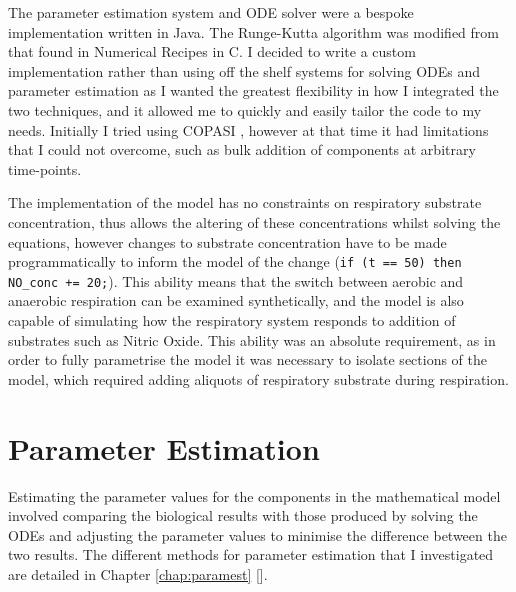 The parameter estimation system and ODE solver were a bespoke implementation written in Java. The Runge-Kutta algorithm was modified from that found in Numerical Recipes in C\cite{Press1992}. I decided to write a custom implementation rather than using off the shelf systems for solving ODEs and parameter estimation as I wanted the greatest flexibility in how I integrated the two techniques, and it allowed me to quickly and easily tailor the code to my needs. Initially I tried using COPASI \cite{Hoops2006}, however at that time it had limitations that I could not overcome, such as bulk addition of components at arbitrary time-points.

The implementation of the model has no constraints on respiratory substrate concentration, thus allows the altering of these concentrations whilst solving the equations, however changes to substrate concentration have to be made programmatically to inform the model of the change (\texttt{if (t == 50) then NO\_conc += 20;}). This ability means that the switch between aerobic and anaerobic respiration can be examined synthetically, and the model is also capable of simulating how the respiratory system responds to addition of substrates such as Nitric Oxide. This ability was an absolute requirement, as in order to fully parametrise the model it was necessary to isolate sections of the model, which required adding aliquots of respiratory substrate during respiration.

\section{Parameter Estimation}
Estimating the parameter values for the components in the mathematical model involved comparing the biological results with those produced by solving the ODEs and adjusting the parameter values to minimise the difference between the two results. The different methods for parameter estimation that I investigated are detailed in Chapter \ref{chap:paramest} [].